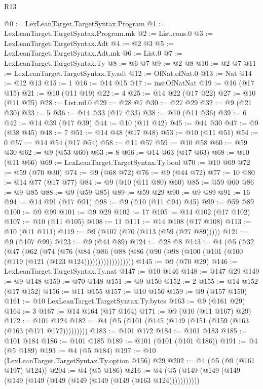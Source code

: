 \begin{lexlean}{R13}
\begin{coremodule}
{{{{{{{{{{{{{{{{{{{{{{{{{{{{{{{{{{{{{{{{{{{{{{{{{{{{{{@0 := LexLeanTarget.TargetSyntax.Program
@1 := LexLeanTarget.TargetSyntax.Program.mk
@2 := List.cons.{0}
@3 := LexLeanTarget.TargetSyntax.Adt
@4 := @2 @3
@5 := LexLeanTarget.TargetSyntax.Adt.mk
@6 := List.{0}
@7 := LexLeanTarget.TargetSyntax.Ty
@8 := @6 @7
@9 := @2 @8
@10 := @2 @7
@11 := LexLeanTarget.TargetSyntax.Ty.adt
@12 := OfNat.ofNat.{0}
@13 := Nat
@14 := @12 @13
@15 := 1
@16 := @14 @15
@17 := instOfNatNat
@19 := @16 (@17 @15)
@21 := @10 (@11 @19)
@22 := 4
@25 := @14 @22 (@17 @22)
@27 := @10 (@11 @25)
@28 := List.nil.{0}
@29 := @28 @7
@30 := @27 @29
@32 := @9 (@21 @30)
@33 := 5
@36 := @14 @33 (@17 @33)
@38 := @10 (@11 @36)
@39 := 6
@42 := @14 @39 (@17 @39)
@44 := @10 (@11 @42)
@45 := @44 @30
@47 := @9 (@38 @45)
@48 := 7
@51 := @14 @48 (@17 @48)
@53 := @10 (@11 @51)
@54 := 0
@57 := @14 @54 (@17 @54)
@58 := @11 @57
@59 := @10 @58
@60 := @59 @30
@62 := @9 (@53 @60)
@63 := 8
@66 := @14 @63 (@17 @63)
@68 := @10 (@11 @66)
@69 := LexLeanTarget.TargetSyntax.Ty.bool
@70 := @10 @69
@72 := @59 (@70 @30)
@74 := @9 (@68 @72)
@76 := @9 (@44 @72)
@77 := 10
@80 := @14 @77 (@17 @77)
@84 := @9 (@10 (@11 @80) @60)
@85 := @59 @60
@86 := @9 @85
@88 := @9 (@59 @85)
@89 := @59 @29
@90 := @9 @89
@91 := 16
@94 := @14 @91 (@17 @91)
@98 := @9 (@10 (@11 @94) @45)
@99 := @59 @89
@100 := @9 @99
@101 := @9 @29
@102 := 17
@105 := @14 @102 (@17 @102)
@107 := @10 (@11 @105)
@108 := 11
@111 := @14 @108 (@17 @108)
@113 := @10 (@11 @111)
@119 := @9 (@107 (@70 (@113 (@59 (@27 @89)))))
@121 := @9 (@107 @99)
@123 := @9 (@44 @89)
@124 := @28 @8
@143 := @4
    (@5
      (@32
        (@47
          (@62
            (@74
              (@76
                (@84
                  (@86
                    (@88 (@86 (@90 (@98 (@100 (@101 (@100 (@119 (@121 (@123 @124))))))))))))))))))
@145 := @9 (@70 @29)
@146 := LexLeanTarget.TargetSyntax.Ty.nat
@147 := @10 @146
@148 := @147 @29
@149 := @9 @148
@150 := @70 @148
@151 := @9 @150
@152 := 2
@155 := @14 @152 (@17 @152)
@156 := @11 @155
@157 := @10 @156
@159 := @9 (@157 @150)
@161 := @10 LexLeanTarget.TargetSyntax.Ty.bytes
@163 := @9 (@161 @29)
@164 := 3
@167 := @14 @164 (@17 @164)
@171 := @9 (@10 (@11 @167) @29)
@172 := @101 @124
@182 := @4 (@5 (@101 (@145 (@149 (@151 (@159 (@163 (@163 (@171 @172)))))))))
@183 := @101 @172
@184 := @101 @183
@185 := @101 @184
@186 := @101 @185
@189 := @101 (@101 (@101 @186))
@191 := @4 (@5 @189)
@193 := @4 (@5 @184)
@197 := @10 (LexLeanTarget.TargetSyntax.Ty.option @156) @29
@202 := @4 (@5 (@9 (@161 @197) @124))
@204 := @4 (@5 @186)
@216 := @4 (@5 (@149 (@149 (@149 (@149 (@149 (@149 (@149 (@149 (@149 (@163 @124)))))))))))
}}}}}}}}}}}}}}}}}}}}}}}}}}}}}}}}}}}}}}}}}}}}}}}}}}}}}}
\end{coremodule}
\end{lexlean}
